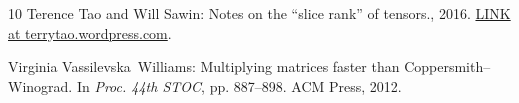 \documentclass[11pt]{article}
\numberwithin{equation}{section}
\theoremstyle{definition}
\theoremstyle{plain}
\theoremstyle{definition}
\begin{document}
\begin{thebibliography}{10}
{\sc Terence Tao and Will Sawin}: Notes on the ``slice rank'' of tensors.,
  2016.
\newblock
  \href{https://terrytao.wordpress.com/2016/08/24/notes-on-the-slice-rank-of-tensors/}{LINK
  at terrytao.wordpress.com}.

{\sc Virginia Vassilevska~Williams}: Multiplying matrices faster than
  {C}oppersmith--{W}inograd.
\newblock In {\em Proc. 44th STOC}, pp. 887--898. ACM Press, 2012.
\newblock [\epfmtdoi{10.1145/2213977.2214056}]

\end{thebibliography}
\end{document}

